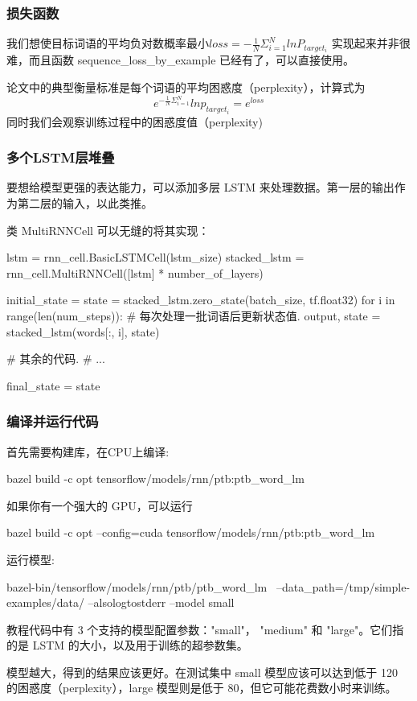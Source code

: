 \subsubsection{损失函数}
我们想使目标词语的平均负对数概率最小$loss = -\frac{1}{N}\Sigma_{i=1}^NlnP_{target_i}$
实现起来并非很难，而且函数 sequence\_loss\_by\_example 已经有了，可以直接使用。

论文中的典型衡量标准是每个词语的平均困惑度（perplexity），计算式为
$$e^{-\frac{1}{N}\Sigma_{i=1}^N}lnp_{target_i}=e^{loss}$$
同时我们会观察训练过程中的困惑度值（perplexity)
\subsubsection{多个LSTM层堆叠}
要想给模型更强的表达能力，可以添加多层 LSTM 来处理数据。第一层的输出作为第二层的输入，以此类推。

类 MultiRNNCell 可以无缝的将其实现：
\begin{python}
lstm = rnn_cell.BasicLSTMCell(lstm_size)
stacked_lstm = rnn_cell.MultiRNNCell([lstm] * number_of_layers)

initial_state = state = stacked_lstm.zero_state(batch_size, tf.float32)
for i in range(len(num_steps)):
    # 每次处理一批词语后更新状态值.
    output, state = stacked_lstm(words[:, i], state)

    # 其余的代码.
    # ...

final_state = state
\end{python}
\subsubsection{编译并运行代码}
首先需要构建库，在CPU上编译:
\begin{python}
bazel build -c opt tensorflow/models/rnn/ptb:ptb_word_lm
\end{python}
如果你有一个强大的 GPU，可以运行
\begin{python}
bazel build -c opt --config=cuda tensorflow/models/rnn/ptb:ptb_word_lm
\end{python}
运行模型:
\begin{python}
bazel-bin/tensorflow/models/rnn/ptb/ptb_word_lm \
  --data_path=/tmp/simple-examples/data/ --alsologtostderr --model small
\end{python}
教程代码中有 3 个支持的模型配置参数："small"， "medium" 和 "large"。它们指的是 LSTM 的大小，以及用于训练的超参数集。

模型越大，得到的结果应该更好。在测试集中 small 模型应该可以达到低于 120 的困惑度（perplexity），large 模型则是低于 80，但它可能花费数小时来训练。
